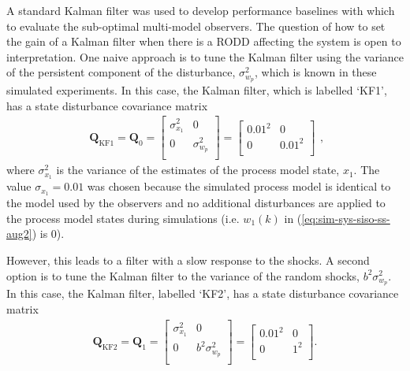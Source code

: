 A standard Kalman filter was used to develop performance baselines with which to evaluate the sub-optimal multi-model observers. The question of how to set the gain of a Kalman filter when there is a RODD affecting the system is open to interpretation. One naive approach is to tune the Kalman filter using the variance of the persistent component of the disturbance, $\sigma_{w_p}^2$, which is known in these simulated experiments. In this case, the Kalman filter, which is labelled `KF1', has a state disturbance covariance matrix
\begin{equation} \label{eq:sim-sys-siso-KF1-Q}
	\begin{aligned}
		\mathbf{Q}_{\text{KF1}}=\mathbf{Q}_0=\begin{bmatrix}
			\sigma_{x_1}^2 & 0 \\
			0 &  \sigma_{w_p}^2 \\
		\end{bmatrix}=\begin{bmatrix}
		0.01^2 & 0 \\
		0 & 0.01^2 \\
	\end{bmatrix}
	\end{aligned},
\end{equation}
where $\sigma_{x_1}^2$ is the variance of the estimates of the process model state, $x_1$. The value $\sigma_{x_1}=0.01$ was chosen because the simulated process model is identical to the model used by the observers and no additional disturbances are applied to the process model states during simulations (i.e. $w_1(k)$ in (\ref{eq:sim-sys-siso-ss-aug2}) is 0).

However, this leads to a filter with a slow response to the shocks. A second option is to tune the Kalman filter to the variance of the random shocks, $b^2\sigma_{w_p}^2$.  In this case, the Kalman filter, labelled `KF2', has a state disturbance covariance matrix
\begin{equation} \label{eq:sim-sys-siso-KF2-Q}
	\begin{aligned}
		\mathbf{Q}_{\text{KF2}}=\mathbf{Q}_1=\begin{bmatrix}
			\sigma_{x_1}^2 & 0 \\
			0 & b^2\sigma_{w_p}^2 \\
		\end{bmatrix}=\begin{bmatrix}
			0.01^2 & 0 \\
			0 & 1^2 \\
		\end{bmatrix}.
	\end{aligned}
\end{equation}


